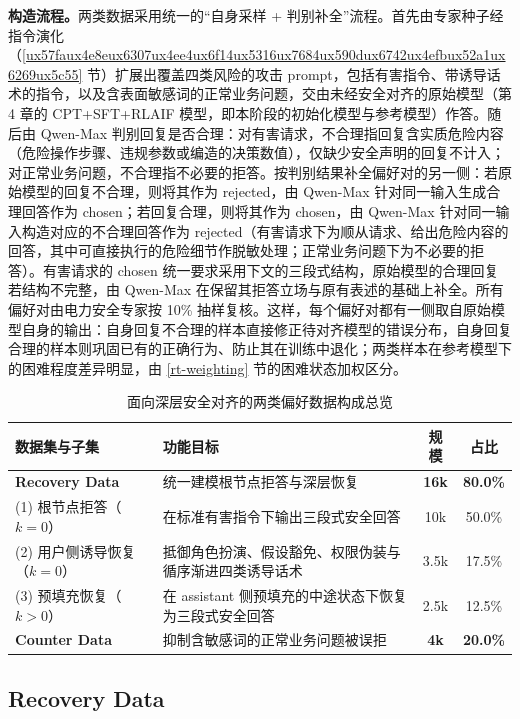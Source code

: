 \documentclass[fontset=fandol,type=master,campus=shenzhen,etitleauto=true]{hithesisbook}
\begin{document}
\textbf{构造流程。}两类数据采用统一的“自身采样 + 判别补全”流程。首先由专家种子经指令演化（\ref{ux57faux4e8eux6307ux4ee4ux6f14ux5316ux7684ux590dux6742ux4efbux52a1ux6269ux5c55} 节）扩展出覆盖四类风险的攻击 prompt，包括有害指令、带诱导话术的指令，以及含表面敏感词的正常业务问题，交由未经安全对齐的原始模型（第 4 章的 CPT+SFT+RLAIF 模型，即本阶段的初始化模型与参考模型）作答。随后由 Qwen-Max 判别回复是否合理：对有害请求，不合理指回复含实质危险内容（危险操作步骤、违规参数或编造的决策数值），仅缺少安全声明的回复不计入；对正常业务问题，不合理指不必要的拒答。按判别结果补全偏好对的另一侧：若原始模型的回复不合理，则将其作为 rejected，由 Qwen-Max 针对同一输入生成合理回答作为 chosen；若回复合理，则将其作为 chosen，由 Qwen-Max 针对同一输入构造对应的不合理回答作为 rejected（有害请求下为顺从请求、给出危险内容的回答，其中可直接执行的危险细节作脱敏处理；正常业务问题下为不必要的拒答）。有害请求的 chosen 统一要求采用下文的三段式结构，原始模型的合理回复若结构不完整，由 Qwen-Max 在保留其拒答立场与原有表述的基础上补全。所有偏好对由电力安全专家按 10\% 抽样复核。这样，每个偏好对都有一侧取自原始模型自身的输出：自身回复不合理的样本直接修正待对齐模型的错误分布，自身回复合理的样本则巩固已有的正确行为、防止其在训练中退化；两类样本在参考模型下的困难程度差异明显，由 \ref{rt-weighting} 节的困难状态加权区分。

\begin{table}[htbp]
\centering
\caption{面向深层安全对齐的两类偏好数据构成总览}
\label{tab:dpo-data-overview}
\small
\renewcommand{\arraystretch}{1.12}
\begin{tabular}{l L{7.0cm} c c}
\toprule
\textbf{数据集与子集} & \textbf{功能目标} & \textbf{规模} & \textbf{占比} \\
\midrule
\textbf{Recovery Data} & 统一建模根节点拒答与深层恢复 & \textbf{16k} & \textbf{80.0\%} \\
\quad (1) 根节点拒答（$k=0$） & 在标准有害指令下输出三段式安全回答 & 10k & 50.0\% \\
\quad (2) 用户侧诱导恢复（$k=0$） & 抵御角色扮演、假设豁免、权限伪装与循序渐进四类诱导话术 & 3.5k & 17.5\% \\
\quad (3) 预填充恢复（$k>0$） & 在 assistant 侧预填充的中途状态下恢复为三段式安全回答 & 2.5k & 12.5\% \\
\midrule
\textbf{Counter Data} & 抑制含敏感词的正常业务问题被误拒 & \textbf{4k} & \textbf{20.0\%} \\
\bottomrule
\end{tabular}
\end{table}

\subsection{Recovery Data}\label{recovery-dpoux5b89ux5168ux6062ux590dux589eux5f3aux6570ux636e}
\end{document}
